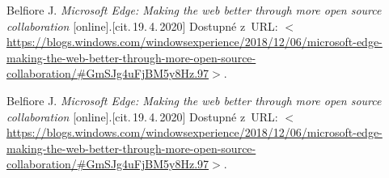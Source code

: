 \begin{thebibliography}{1}
    
Belfiore J. \emph{Microsoft Edge: Making the web better through more open source collaboration}\/ [online].[cit.\,19.\,4.\,2020]
Dostupné z~URL:
\(<\)\url{https://blogs.windows.com/windowsexperience/2018/12/06/microsoft-edge-making-the-web-better-through-more-open-source-collaboration/#GmSJg4uFjBM5y8Hz.97}\(>\).

Belfiore J. \emph{Microsoft Edge: Making the web better through more open source collaboration}\/ [online].[cit.\,19.\,4.\,2020]
Dostupné z~URL:
\(<\)\url{https://blogs.windows.com/windowsexperience/2018/12/06/microsoft-edge-making-the-web-better-through-more-open-source-collaboration/#GmSJg4uFjBM5y8Hz.97}\(>\).
    
\end{thebibliography}
